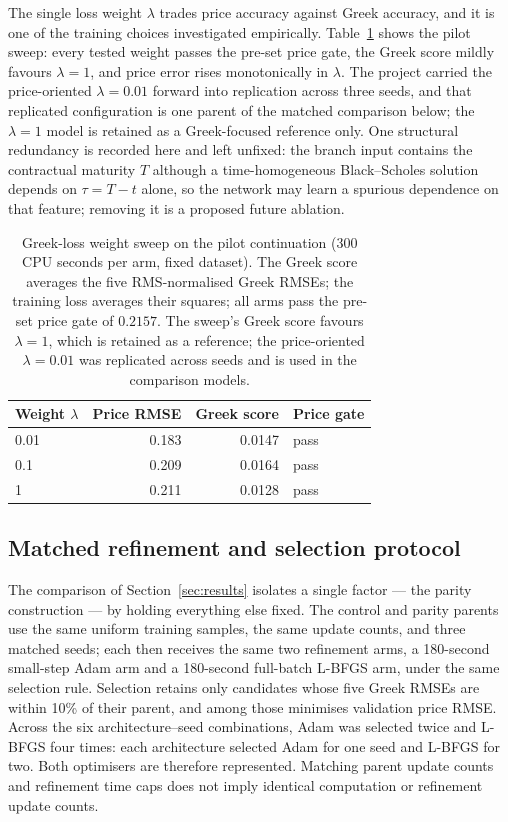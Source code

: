 \documentclass[11pt,a4paper]{article}
\begin{document}
The single loss weight $\lambda$ trades price accuracy against Greek accuracy, and it is one of the training choices investigated empirically. Table~\ref{tab:weight-sweep} shows the pilot sweep: every tested weight passes the pre-set price gate, the Greek score mildly favours $\lambda=1$, and price error rises monotonically in $\lambda$. The project carried the price-oriented $\lambda=0.01$ forward into replication across three seeds, and that replicated configuration is one parent of the matched comparison below; the $\lambda=1$ model is retained as a Greek-focused reference only. One structural redundancy is recorded here and left unfixed: the branch input contains the contractual maturity $T$ although a time-homogeneous Black--Scholes solution depends on $\tau=T-t$ alone, so the network may learn a spurious dependence on that feature; removing it is a proposed future ablation.

\begin{table}[!ht]\centering\small
\caption{Greek-loss weight sweep on the pilot continuation (300 CPU seconds per arm, fixed dataset). The Greek score averages the five RMS-normalised Greek RMSEs; the training loss averages their squares; all arms pass the pre-set price gate of $0.2157$. The sweep's Greek score favours $\lambda=1$, which is retained as a reference; the price-oriented $\lambda=0.01$ was replicated across seeds and is used in the comparison models.}
\label{tab:weight-sweep}
\begin{tabular}{lrrl}\toprule
Weight $\lambda$ & Price RMSE & Greek score & Price gate\\\midrule
0.01 & 0.183 & 0.0147 & pass\\
0.1  & 0.209 & 0.0164 & pass\\
1    & 0.211 & 0.0128 & pass\\\bottomrule
\end{tabular}\end{table}

\subsection{Matched refinement and selection protocol}
\label{sec:deeponet-protocol}

The comparison of Section~\ref{sec:results} isolates a single factor --- the parity construction --- by holding everything else fixed. The control and parity parents use the same uniform training samples, the same update counts, and three matched seeds; each then receives the same two refinement arms, a 180-second small-step Adam arm and a 180-second full-batch L-BFGS arm, under the same selection rule. Selection retains only candidates whose five Greek RMSEs are within 10\% of their parent, and among those minimises validation price RMSE. Across the six architecture--seed combinations, Adam was selected twice and L-BFGS four times: each architecture selected Adam for one seed and L-BFGS for two. Both optimisers are therefore represented. Matching parent update counts and refinement time caps does not imply identical computation or refinement update counts.
\end{document}

